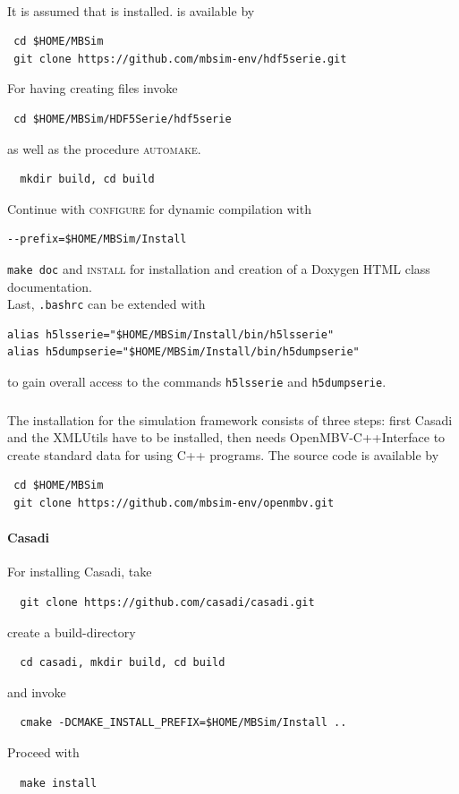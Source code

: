\paragraph{\HDFSerie}
It is assumed that \FMatVec{} is installed. \HDFSerie is available by
\begin{verbatim}
 cd $HOME/MBSim
 git clone https://github.com/mbsim-env/hdf5serie.git
\end{verbatim}
For having \MBSim{} creating \HDF{} files invoke
\begin{verbatim}
 cd $HOME/MBSim/HDF5Serie/hdf5serie
\end{verbatim}
as well as the procedure \textsc{automake}.
\begin{verbatim}
  mkdir build, cd build
\end{verbatim}
Continue with \textsc{configure} for dynamic compilation with
\begin{verbatim}
--prefix=$HOME/MBSim/Install
\end{verbatim}
\texttt{make doc} and \textsc{install} for installation and creation of a Doxygen HTML class documentation.\\
%
Last, \texttt{.bashrc} can be extended with
\begin{verbatim}
alias h5lsserie="$HOME/MBSim/Install/bin/h5lsserie"
alias h5dumpserie="$HOME/MBSim/Install/bin/h5dumpserie"
\end{verbatim}
to gain overall access to the commands \texttt{h5lsserie} and \texttt{h5dumpserie}.

\subsubsection{\OpenMBV{}}
The installation for the simulation framework consists of three steps: first Casadi and the XMLUtils have to be installed, then \MBSim{} needs \textsf{OpenMBV-C++Interface} to create standard data for \OpenMBV{} using C++ programs. The source code is available by
\begin{verbatim}
 cd $HOME/MBSim
 git clone https://github.com/mbsim-env/openmbv.git
\end{verbatim}
%
\paragraph{Casadi}
For installing Casadi, take
\begin{verbatim}
  git clone https://github.com/casadi/casadi.git
\end{verbatim}
create a build-directory
\begin{verbatim}
  cd casadi, mkdir build, cd build
\end{verbatim}
and invoke
\begin{verbatim}
  cmake -DCMAKE_INSTALL_PREFIX=$HOME/MBSim/Install ..
\end{verbatim}
Proceed with
\begin{verbatim}
  make install
\end{verbatim}
%
